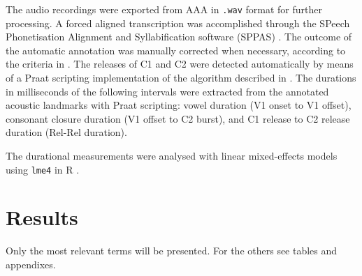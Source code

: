 \documentclass[]{JASAnew}
\begin{document}

The audio recordings were exported from AAA in \texttt{.wav} format for
further processing. A forced aligned transcription was accomplished
through the SPeech Phonetisation Alignment and Syllabification software
(SPPAS) \citep{bigi2015}. The outcome of the automatic annotation was
manually corrected when necessary, according to the criteria in
. The releases of C1 and C2 were detected
automatically by means of a Praat scripting implementation of the
algorithm described in \citet{ananthapadmanabha2014}. The durations in
milliseconds of the following intervals were extracted from the
annotated acoustic landmarks with Praat scripting: vowel duration (V1
onset to V1 offset), consonant closure duration (V1 offset to C2 burst),
and C1 release to C2 release duration (Rel-Rel duration).

The durational measurements were analysed with linear mixed-effects
models using \texttt{lme4} in R \citep{r-core-team2017, bates2015}.

\hypertarget{results}{%
\section{Results}\label{results}}

Only the most relevant terms will be presented. For the others see
tables and appendixes.
\end{document}
